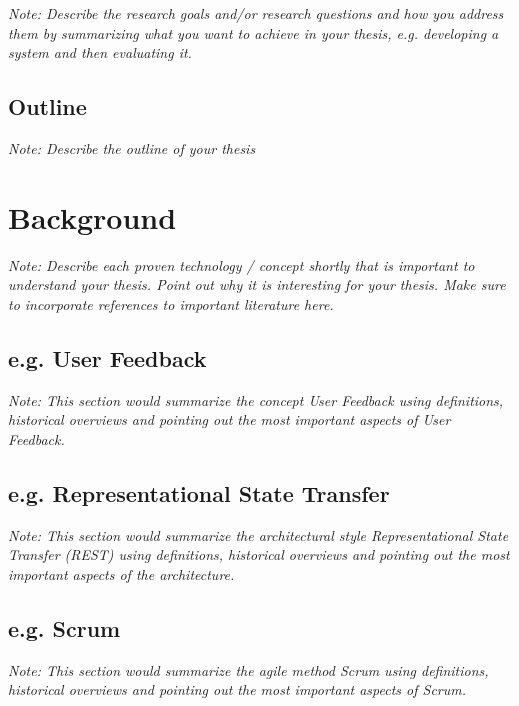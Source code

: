 \documentclass[a4paper,12pt,twoside]{report}
\begin{document}
\textit{Note: Describe the research goals and/or research questions and how you address them by summarizing what you want to achieve in your thesis, e.g. developing a system and then evaluating it.}

\section{Outline}

\textit{Note: Describe the outline of your thesis}





\chapter{Background}

\textit{Note: Describe each proven technology / concept shortly that is important to understand your thesis. Point out why it is interesting for your thesis. Make sure to incorporate references to important literature here.}

\section{e.g. User Feedback}

\textit{Note: This section would summarize the concept User Feedback using definitions, historical overviews and pointing out the most important aspects of User Feedback.}

\section{e.g. Representational State Transfer}

\textit{Note: This section would summarize the architectural style Representational State Transfer (REST) using definitions, historical overviews and pointing out the most important aspects of the architecture.}

\section{e.g. Scrum}

\textit{Note: This section would summarize the agile method Scrum using definitions, historical overviews and pointing out the most important aspects of Scrum.}



\end{document}
